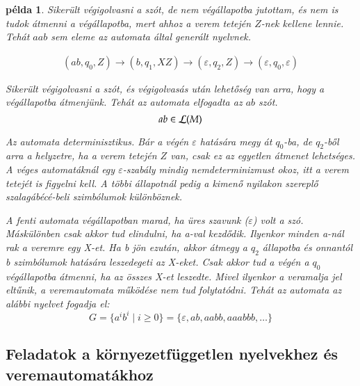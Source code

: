 \documentclass[a4paper]{article}
\newtheorem{pelda}{példa}[section]
\begin{document}
\begin{pelda}
Sikerült végigolvasni a szót, de nem végállapotba jutottam, és nem is
tudok átmenni a végállapotba, mert ahhoz a verem tetején $Z$-nek kellene
lennie. Tehát $aab$ sem eleme az automata által generált nyelvnek.

\begin{gather*}
(ab, q_0, Z) \to (b,q_1,XZ) \to (\varepsilon,q_2,Z) \to
(\varepsilon,q_0,\varepsilon) 
\end{gather*}

Sikerült végigolvasni a szót, és végigolvasás után lehetőség van arra,
hogy a végállapotba átmenjünk. Tehát az automata elfogadta az $ab$ szót.
\[ab \in {\cal L} (M)\]

Az automata determinisztikus. Bár a végén $\varepsilon$ hatására megy át
$q_0$-ba, de $q_2$-ből arra a helyzetre, ha a verem tetején $Z$ van,
csak ez az egyetlen átmenet lehetséges. A véges automatáknál egy
$\varepsilon$-szabály mindig nemdeterminizmust okoz, itt a verem tetejét
is figyelni kell. A többi állapotnál pedig a kimenő
nyilakon szereplő szalagábécé-beli szimbólumok különböznek.

A fenti automata végállapotban marad, ha üres szavunk ($\varepsilon$) volt
a szó. Máskülönben csak akkor tud elindulni, ha a-val kezdődik.
Ilyenkor minden a-nál rak a veremre egy X-et. Ha b jön ezután, akkor
átmegy a $q_2$ állapotba és onnantól b szimbólumok hatására leszedegeti az
X-eket. Csak akkor tud a végén a $q_0$ végállapotba átmenni, ha az
összes X-et leszedte. Mivel ilyenkor a veramalja jel eltűnik, a
veremautomata működése nem tud folytatódni. Tehát az automata az alábbi
nyelvet fogadja el:
\[G = \{a^ib^i  \mid i \ge 0\}=\{\varepsilon, ab, aabb, aaabbb, \ldots\}\]
\end{pelda}


\subsection{Feladatok a környezetfüggetlen nyelvekhez és veremautomatákhoz}
\end{document}

